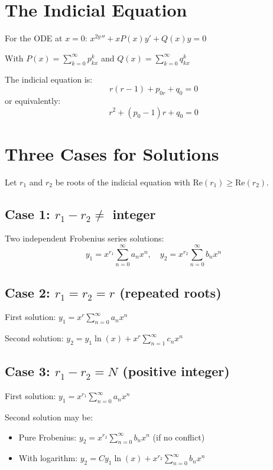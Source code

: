 \documentclass[12pt]{article}
\begin{document}
\section{The Indicial Equation}

\begin{frobenius}
For the ODE at $x = 0$: $x^{2y}'' + xP(x)y' + Q(x)y = 0$

With $P(x) = \sum_{k=0}^{\infty} p_{kx}^k$ and $Q(x) = \sum_{k=0}^{\infty} q_{kx}^k$

The indicial equation is:
$$r(r-1) + p_{0r} + q_{0} = 0$$
or equivalently:
$$r^{2} + (p_{0}-1)r + q_{0} = 0$$
\end{frobenius}

\section{Three Cases for Solutions}

\begin{keypoint}
Let $r_{1}$ and $r_{2}$ be roots of the indicial equation with $\text{Re}(r_{1}) \geq \text{Re}(r_{2})$.
\end{keypoint}

\subsection{Case 1: $r_{1} - r_{2} \neq$ integer}

Two independent Frobenius series solutions:
$$y_{1} = x^{r_{1}}\sum_{n=0}^{\infty} a_{n} x^{n}, \quad y_{2} = x^{r_{2}}\sum_{n=0}^{\infty} b_{n} x^{n}$$

\subsection{Case 2: $r_{1} = r_{2} = r$ (repeated roots)}

First solution: $y_{1} = x^{r}\sum_{n=0}^{\infty} a_{n} x^{n}$

Second solution: $y_{2} = y_{1}\ln(x) + x^{r}\sum_{n=1}^{\infty} c_{n} x^{n}$

\subsection{Case 3: $r_{1} - r_{2} = N$ (positive integer)}

First solution: $y_{1} = x^{r_{1}}\sum_{n=0}^{\infty} a_{n} x^{n}$

Second solution may be:
\begin{itemize}
\item Pure Frobenius: $y_{2} = x^{r_{2}}\sum_{n=0}^{\infty} b_{n} x^{n}$ (if no conflict)
\item With logarithm: $y_{2} = Cy_{1}\ln(x) + x^{r_{2}}\sum_{n=0}^{\infty} b_{n} x^{n}$
\end{itemize}
\end{document}
